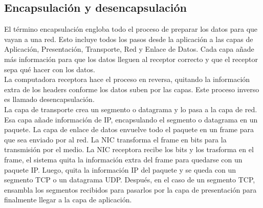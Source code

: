 \documentclass[12pt]{report}
\begin{document}
\subsection{Encapsulación y desencapsulación}
El término encapsulación engloba todo el proceso de preparar los datos
para que vayan a una red. Esto incluye todos los pasos desde la aplicación a las capas 
de Aplicación, Presentación, Transporte, Red y Enlace de Datos.
Cada capa añade más información para que los datos lleguen al receptor correcto
y que el receptor sepa qué hacer con los datos.\\
La computadora receptora hace el proceso en reversa, quitando la información 
extra de los headers conforme los datos suben por las capas. Este proceso inverso
es llamado desencapsulación.\\
La capa de transporte crea un segmento o datagrama y lo pasa a la capa de red. 
Esa capa añade información de IP, encapsulando el segmento o datagrama en un paquete.
La capa de enlace de datos envuelve todo el paquete en un frame para que sea enviado por al red.
La NIC transforma el frame en bits para la transmisión por el medio.
La NIC receptora recibe los bits y los trasforma en el frame,
el sistema quita la información extra del frame para quedarse con un paquete IP.
Luego, quita la información IP del paquete y se queda con un segmento TCP o un 
datagrama UDP. Después, en el caso de un segmento TCP, ensambla los segmentos
recibidos para pasarlos por la capa de presentación para finalmente llegar a la capa de aplicación.
\end{document}
